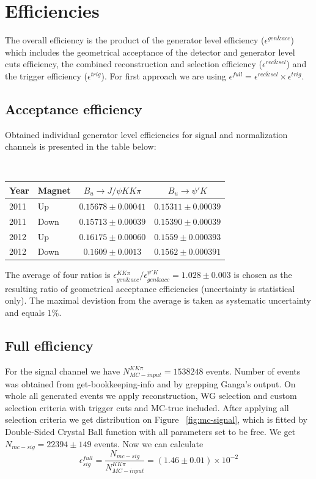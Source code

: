 \section{Efficiencies}

The overall efficiency is the product of the generator level efficiency ($\epsilon^{gen\&acc}$) which includes the geometrical acceptance of the detector and generator level cuts efficiency, the combined reconstruction and selection efficiency ($\epsilon^{rec\&sel}$) and the trigger efficiency ($\epsilon^{trig}$). For first approach we are using $\epsilon^{full} = \epsilon^{rec\&sel} \times \epsilon^{trig}$.


\subsection{Acceptance efficiency}
Obtained individual generator level efficiencies for signal and normalization channels is presented in the table below:


\vspace*{0.5cm}
\mbox{~}
\begin{tabular}{|l|l|c|c|}
\hline
Year & Magnet & $B_{u} \to J/\psi KK\pi$ & $B_{u} \to \psi' K$ \\
\hline
2011 & Up   & $0.15678 \pm 0.00041$ & $0.15311 \pm 0.00039$ \\
2011 & Down & $0.15713 \pm 0.00039$ & $0.15390 \pm 0.00039$ \\
2012 & Up   & $0.16175 \pm 0.00060$ & $0.1559  \pm 0.000393$ \\
2012 & Down & $0.1609  \pm 0.0013$  & $0.1562  \pm 0.000391$ \\
\hline
\end{tabular}
\vspace*{0.5cm}

The average of four ratios is $\epsilon_{gen\&acc}^{KK\pi} / \epsilon_{gen\&acc}^{\psi'K} = 1.028 \pm 0.003$ is chosen as the resulting ratio of geometrical acceptance efficiencies (uncertainty is statistical only). The maximal devistion from the average is taken as systematic uncertainty and equals $1\%$.

\subsection{Full efficiency}

For the signal channel we have $N_{MC-input}^{KK\pi} = 1538248$ events. Number of events was obtained from get-bookkeeping-info and by grepping Ganga's output. On whole all generated events we apply reconstruction, WG selection and custom selection criteria with trigger cuts and MC-true included. After applying all selection criteria we get distribution on Figure ~\ref{fig:mc-signal}, which is fitted by Double-Sided Crystal Ball function with all parameters set to be free. We get $N_{mc-sig} = 22394 \pm 149$ events. Now we can calculate 
$$\epsilon^{full}_{sig} =  \frac { N_{mc-sig} }{ N_{MC-input}^{KK\pi} } =  (1.46 \pm 0.01) \times 10^{-2}$$

